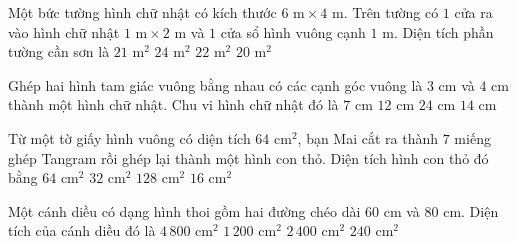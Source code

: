 \begin{ex} %
Một bức tường hình chữ nhật có kích thước $6\text{ m} \times 4\text{ m}$. Trên tường có $1$ cửa ra vào hình chữ nhật $1\text{ m} \times 2\text{ m}$ và $1$ cửa sổ hình vuông cạnh $1\text{ m}$. Diện tích phần tường cần sơn là
\choice
{\True $21\text{ m}^2$}
{$24\text{ m}^2$}
{$22\text{ m}^2$}
{$20\text{ m}^2$}
\end{ex}

\begin{ex} %
Ghép hai hình tam giác vuông bằng nhau có các cạnh góc vuông là $3\text{ cm}$ và $4\text{ cm}$ thành một hình chữ nhật. Chu vi hình chữ nhật đó là
\choice
{$7\text{ cm}$}
{$12\text{ cm}$}
{$24\text{ cm}$}
{\True $14\text{ cm}$}
\end{ex}

\begin{ex} %
Từ một tờ giấy hình vuông có diện tích $64\text{ cm}^2$, bạn Mai cắt ra thành $7$ miếng ghép Tangram rồi ghép lại thành một hình con thỏ. Diện tích hình con thỏ đó bằng
\choice
{\True $64\text{ cm}^2$}
{$32\text{ cm}^2$}
{$128\text{ cm}^2$}
{$16\text{ cm}^2$}
\end{ex}

\begin{ex} %
Một cánh diều có dạng hình thoi gồm hai đường chéo dài $60\text{ cm}$ và $80\text{ cm}$. Diện tích của cánh diều đó là
\choice
{$4\,800\text{ cm}^2$}
{$1\,200\text{ cm}^2$}
{\True $2\,400\text{ cm}^2$}
{$240\text{ cm}^2$}
\end{ex}

